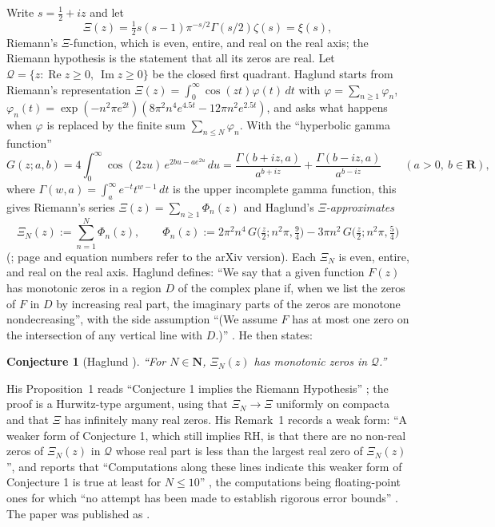 \documentclass[11pt]{article}
\theoremstyle{plain}
\newtheorem{conjecture}{Conjecture}
\theoremstyle{definition}
\theoremstyle{remark}
\newcommand{\R}{\mathbf{R}}
\newcommand{\N}{\mathbf{N}}
\newcommand{\Q}{\mathcal{Q}}
\newcommand{\re}{\operatorname{Re}}
\newcommand{\im}{\operatorname{Im}}
\begin{document}
Write $s = \tfrac12 + iz$ and let
\begin{equation}\label{eq:Xi}
\Xi(z) = \tfrac12 s(s-1)\pi^{-s/2}\Gamma(s/2)\zeta(s) = \xi(s),
\end{equation}
Riemann's $\Xi$-function, which is even, entire, and real on the real axis; the
Riemann hypothesis is the statement that all its zeros are real. Let
$\Q = \{z : \re z \ge 0,\ \im z \ge 0\}$ be the closed first quadrant. Haglund
\cite{Hag} starts from Riemann's representation
$\Xi(z) = \int_0^\infty \cos(zt)\varphi(t)\,dt$ with
$\varphi = \sum_{n \ge 1}\varphi_n$,
$\varphi_n(t) = \exp(-n^2\pi e^{2t})(8\pi^2 n^4 e^{4.5t} - 12\pi n^2 e^{2.5t})$,
and asks what happens when $\varphi$ is replaced by the finite sum
$\sum_{n \le N}\varphi_n$. With the ``hyperbolic gamma function''
\begin{equation}\label{eq:G}
G(z;a,b) = 4\int_0^\infty \cos(2zu)\,e^{2bu - a e^{2u}}\,du
= \frac{\Gamma(b+iz,a)}{a^{b+iz}} + \frac{\Gamma(b-iz,a)}{a^{b-iz}}
\qquad (a > 0,\ b \in \R),
\end{equation}
where $\Gamma(w,a) = \int_a^\infty e^{-t}t^{w-1}\,dt$ is the upper incomplete gamma
function, this gives Riemann's series
$\Xi(z) = \sum_{n \ge 1}\Phi_n(z)$ and Haglund's \emph{$\Xi$-approximates}
\begin{equation}\label{eq:XiN}
\Xi_N(z) := \sum_{n=1}^{N}\Phi_n(z), \qquad
\Phi_n(z) := 2\pi^2 n^4\, G\bigl(\tfrac{z}{2}; n^2\pi, \tfrac94\bigr)
- 3\pi n^2\, G\bigl(\tfrac{z}{2}; n^2\pi, \tfrac54\bigr)
\end{equation}
(\cite[(1)--(3), (6), (10)--(14), pp.~1--3]{Hag}; page and equation numbers refer
to the arXiv version). Each $\Xi_N$ is even, entire, and real on the real axis.
Haglund defines: ``We say that a given function $F(z)$ has monotonic zeros in a
region $D$ of the complex plane if, when we list the zeros of $F$ in $D$ by
increasing real part, the imaginary parts of the zeros are monotone
nondecreasing'', with the side assumption ``(We assume $F$ has at most one zero
on the intersection of any vertical line with $D$.)'' \cite[p.~3]{Hag}. He then
states:

\begin{conjecture}[Haglund {\cite[p.~3]{Hag}}]\label{conj:H}
``For $N \in \N$, $\Xi_N(z)$ has monotonic zeros in $\Q$.''
\end{conjecture}

His Proposition~1 reads ``Conjecture 1 implies the Riemann Hypothesis''
\cite[pp.~3--4]{Hag}; the proof is a Hurwitz-type argument, using that
$\Xi_N \to \Xi$ uniformly on compacta and that $\Xi$ has infinitely many real
zeros. His Remark~1 records a weak form: ``A weaker form of Conjecture 1, which
still implies RH, is that there are no non-real zeros of $\Xi_N(z)$ in $\Q$ whose
real part is less than the largest real zero of $\Xi_N(z)$'', and reports that
``Computations along these lines indicate this weaker form of Conjecture 1 is
true at least for $N \le 10$'' \cite[p.~4]{Hag}, the computations being
floating-point ones for which ``no attempt has been made to establish rigorous
error bounds'' \cite[p.~3]{Hag}. The paper was published as \cite{HagJ}.
\end{document}
